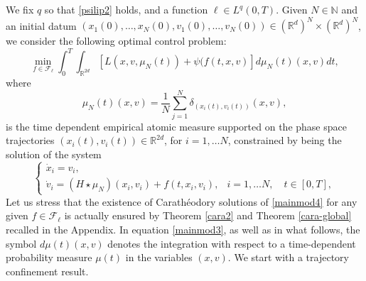 \documentclass[11pt]{article}
\theoremstyle{plain}
\theoremstyle{definition}
\theoremstyle{remark}
\numberwithin{equation}{section}
\begin{document}
We fix $q$ so that \eqref{psilip2} holds, and a function $\ell \in L^q(0,T)$. Given $N\in \mathbb N$ and an initial datum $(x_1(0), \dots, x_N(0), v_1(0), \dots, v_N(0)) \in (\mathbb R^d)^N \times (\mathbb R^d)^N$, 
we consider the following optimal control problem:
\begin{equation}\label{mainmod3}
\min_{f \in \mathcal F_\ell} \int_{0}^T \int_{\mathbb R^{2d}} \left [ L(x,v,\mu_N(t)) + \psi(f(t,x,v) \right ] d \mu_N(t)(x,v) dt,
\end{equation}
where 
\begin{equation}\label{muenne}
\mu_N(t)(x,v) = \frac{1}{N} \sum_{j=1}^N \delta_{(x_i(t),v_i(t))}(x,v),
\end{equation}
is the time dependent empirical atomic measure supported on the phase space trajectories $(x_i(t),v_i(t)) \in \mathbb R^{2 d}$, for $i=1,\dots N$, constrained by being the solution 
of the system
\begin{equation}\label{mainmod4}
\left \{
\begin{array}{ll}
\dot x_i = v_i, & \\
\dot v_i = ( H \star \mu_N)(x_i,v_i) + f(t,x_i, v_i), & i=1,\dots N, \quad t \in [0,T],
\end{array}
\right.
\end{equation}
Let us stress that the existence of  Carath{\'e}odory solutions of \eqref{mainmod4} for any given $f \in \mathcal F_\ell$ is actually ensured by Theorem \ref{cara2} and Theorem \ref{cara-global} recalled
in the Appendix.
In equation \eqref{mainmod3}, as well as in what follows, the symbol $d\mu(t)(x,v)$ denotes the integration with respect to a time-dependent probability measure $\mu(t)$ in the variables $(x,v)$.
We start with a trajectory confinement result.
\end{document}
